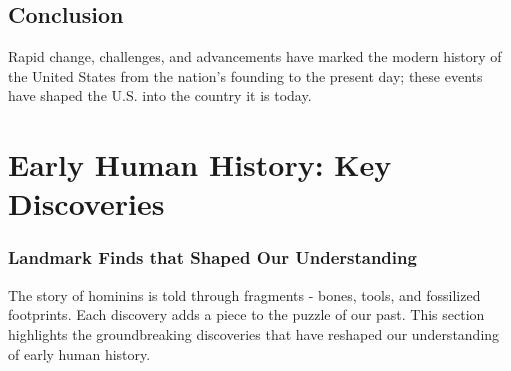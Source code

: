 \documentclass{book}
\begin{document}
\section{Conclusion}
\label{sec:conclusion-modern-usa}
Rapid change, challenges, and advancements have marked the modern history of the United States from the nation's founding to the present day; these events have shaped the U.S. into the country it is today.



\chapter{Early Human History: Key Discoveries}
\subsection*{Landmark Finds that Shaped Our Understanding}
The story of hominins is told through fragments - bones, tools, and fossilized footprints. Each discovery adds a piece to the puzzle of our past. This section highlights the groundbreaking discoveries that have reshaped our understanding of early human history.
\end{document}
